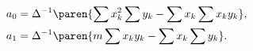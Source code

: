  \begin{equation}
  \begin{split}
    a_{0} &= \Delta^{-1} \paren{\sum x_{k}^{2}\sum y_{k} - \sum x_{k}\sum x_{k}y_{k}}, \\
    a_{1} &= \Delta^{-1} \paren{m \sum x_{k}y_{k} - \sum x_{k}\sum y_{k}}.
  \label{eqn:bevington soln}
  \end{split}
  \end{equation}
\endinput  %